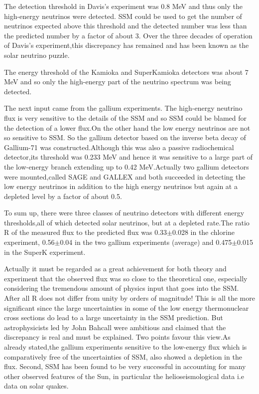 \newpage

The detection threshold in Davis’s experiment was 0.8 MeV and thus
only the high-energy neutrinos were detected. SSM could be used to get the
number of neutrinos expected above this threshold and the detected number
was less than the predicted number by a factor of about 3. Over the three
decades of operation of Davis’s experiment,this discrepancy has remained and has been known as the solar neutrino puzzle.

The energy threshold of the Kamioka and SuperKamioka detectors was
about 7 MeV and so only the high-energy part of the neutrino spectrum was
being detected.

The next input came from the gallium experiments. The high-energy
neutrino flux is very sensitive to the details of the SSM and so SSM could
be blamed for the detection of a lower flux.On the other hand the low energy neutrinos are not so sensitive to SSM. So the gallium detector based
on the inverse beta decay of Gallium-71 was constructed.Although this was
also a passive radiochemical detector,its threshold was 0.233 MeV and hence
it was sensitive to a large part of the low-energy branch extending up to
0.42 MeV.Actually two gallium detectors were mounted,called SAGE and
GALLEX and both succeeded in detecting the low energy neutrinos in addition to the high energy neutrinos but again at a depleted level by a factor of
about 0.5.

To sum up, there were three classes of neutrino detectors with different
energy thresholds,all of which detected solar neutrinos, but at a depleted
rate.The ratio R of the measured flux to the predicted flux was 0.33$\pm$0.028 in
the chlorine experiment, 0.56$\pm$0.04 in the two gallium experiments (average)
and 0.475$\pm$0.015 in the SuperK experiment.

Actually it must be regarded as a great achievement for both theory
and experiment that the observed flux was so close to the theoretical one,
especially considering the tremendous amount of physics input that goes into
the SSM. After all R does not differ from unity by orders of magnitude! This
is all the more significant since the large uncertainties in some of the low
energy thermonuclear cross sections do lead to a large uncertainty in the
SSM prediction. But astrophysicists led by John Bahcall were ambitious
and claimed that the discrepancy is real and must be explained. Two points
favour this view.As already stated,the gallium experiments sensitive to the
low-energy flux which is comparatively free of the uncertainties of SSM, also
showed a depletion in the flux. Second, SSM has been found to be very
successful in accounting for many other observed features of the Sun, in
particular the helioseismological data i.e data on solar quakes.

